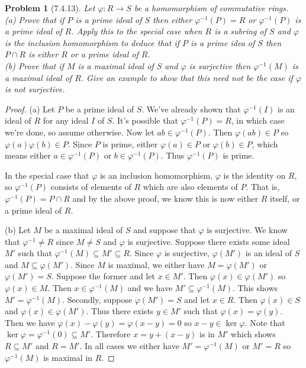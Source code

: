 \documentclass{article}
\newtheorem{problem}{Problem}
\begin{document}
\begin{problem}[7.4.13]
Let $\varphi : R \to S$ be a homomorphism of commutative rings.\\
(a) Prove that if $P$ is a prime ideal of $S$ then either $\varphi^{-1}(P) = R$ or $\varphi^{-1}(P)$ is a prime ideal of $R$. Apply this to the special case when $R$ is a subring of $S$ and $\varphi$ is the inclusion homomorphism to deduce that if $P$ is a prime idea of $S$ then $P \cap R$ is either $R$ or a prime ideal of $R$.\\
(b) Prove that if $M$ is a maximal ideal of $S$ and $\varphi$ is surjective then $\varphi^{-1} (M)$ is a maximal ideal of $R$. Give an example to show that this need not be the case if $\varphi$ is not surjective.
\end{problem}
\begin{proof}
(a) Let $P$ be a prime ideal of $S$. We've already shown that $\varphi^{-1}(I)$ is an ideal of $R$ for any ideal $I$ of $S$. It's possible that $\varphi^{-1}(P) = R$, in which case we're done, so assume otherwise. Now let $ab \in \varphi^{-1}(P)$. Then $\varphi(ab) \in P$ so $\varphi(a)\varphi(b) \in P$. Since $P$ is prime, either $\varphi(a) \in P$ or $\varphi(b) \in P$, which means either $a \in \varphi^{-1}(P)$ or $b \in \varphi^{-1}(P)$. Thus $\varphi^{-1}(P)$ is prime.

In the special case that $\varphi$ is an inclusion homomorphism, $\varphi$ is the identity on $R$, so $\varphi^{-1}(P)$ consists of elements of $R$ which are also elements of $P$. That is, $\varphi^{-1}(P) = P \cap R$ and by the above proof, we know this is now either $R$ itself, or a prime ideal of $R$.

(b) Let $M$ be a maximal ideal of $S$ and suppose that $\varphi$ is surjective. We know that $\varphi^{-1} \neq R$ since $M \neq S$ and $\varphi$ is surjective. Suppose there exists some ideal $M'$ such that $\varphi^{-1}(M) \subseteq M' \subseteq R$. Since $\varphi$ is surjective, $\varphi(M')$ is an ideal of $S$ and $M \subseteq \varphi(M')$. Since $M$ is maximal, we either have $M = \varphi(M')$ or $\varphi(M') = S$. Suppose the former and let $x \in M'$. Then $\varphi(x) \in \varphi(M')$ so $\varphi(x) \in M$. Then $x \in \varphi^{-1}(M)$ and we have $M' \subseteq \varphi^{-1}(M)$. This shows $M' = \varphi^{-1}(M)$. Secondly, suppose $\varphi(M') = S$ and let $x \in R$. Then $\varphi(x) \in S$ and $\varphi(x) \in \varphi(M')$. Thus there exists $y \in M'$ such that $\varphi(x) = \varphi(y)$. Then we have $\varphi(x) - \varphi(y) = \varphi(x-y) = 0$ so $x-y \in \ker \varphi$. Note that $\ker \varphi = \varphi^{-1}(0) \subseteq M'$. Therefore $x = y + (x-y)$ is in $M'$ which shows $R \subseteq M'$ and $R = M'$. In all cases we either have $M' = \varphi^{-1}(M)$ or $M' = R$ so $\varphi^{-1}(M)$ is maximal in $R$.
\end{proof}
\end{document}
